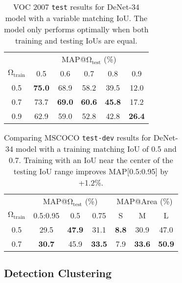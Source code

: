 \documentclass[10pt,twocolumn,letterpaper]{article}
\begin{document}
\begin{table}[tb]
\begin{center}
\begin{tabular}{c|c|c|c|c|c}
 & \multicolumn{5}{|c}{MAP@$\bm{\mathrm{\Omega_{test}}}$ (\%) }\\  
$\bm{\mathrm{\Omega_{train}}}$ & 0.5 & 0.6 & 0.7 & 0.8 & 0.9 \\
\hline
0.5 & \textbf{75.0} & 68.9 & 58.2 & 39.5 & 12.0 \\
0.7 & 73.7 & \textbf{69.0} & \textbf{60.6} & \textbf{45.8} & 17.2 \\
0.9 & 62.9 & 59.0 & 52.8 & 42.8 & \textbf{26.4}
\end{tabular}
\end{center}
\caption{VOC 2007 \texttt{test} results for DeNet-34 model with a variable matching IoU. The model only performs optimally when both training and testing IoUs are equal.}
\label{table:match_ap}
\end{table}

\begin{table}[tb]
\begin{center}
\begin{tabular}{c|ccc|ccc}
 & \multicolumn{3}{|c}{MAP@$\bm{\mathrm{\Omega_{test}}}$ (\%) } & \multicolumn{3}{|c}{MAP@Area (\%) }\\  
 $\bm{\mathrm{\Omega_{train}}}$ & 0.5:0.95 & 0.5 & 0.75 & S & M & L \\
\hline
0.5 & 29.5 & \textbf{47.9} & 31.1 & \textbf{8.8} & 30.9 & 47.0  \\
0.7 & \textbf{30.7} & 45.9 & \textbf{33.5}& 7.9 & \textbf{33.6} & \textbf{50.9} \\
\end{tabular}
\end{center}
\caption{Comparing MSCOCO \texttt{test-dev} results for DeNet-34 model with a training matching IoU of 0.5 and 0.7. Training with an IoU near the center of the testing IoU range improves MAP[0.5:0.95] by +1.2\%.}
\label{table:match_ap_mscoco}
\end{table}

\subsection{Detection Clustering}
\end{document}
